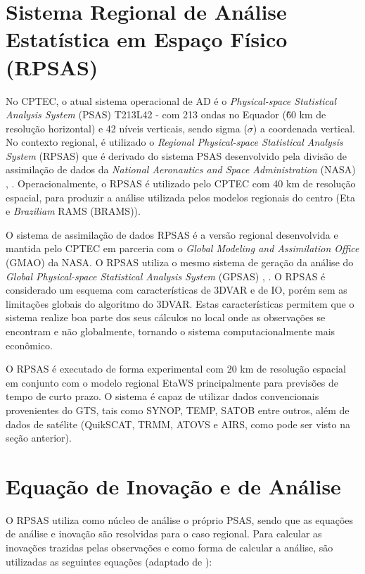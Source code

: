 \section{Sistema Regional de Análise Estatística em Espaço Físico (RPSAS)}
\label{ss:rpsas}

No CPTEC, o atual sistema operacional de AD é o \textit{Physical-space Statistical Analysis System} (PSAS) T213L42 - com 213 ondas no Equador (\~ 60 km de resolução horizontal) e 42 níveis verticais, sendo sigma ($\sigma$) a coordenada vertical. No contexto regional, é utilizado o \textit{Regional Physical-space Statistical Analysis System} (RPSAS) que é derivado do sistema PSAS desenvolvido pela divisão de assimilação de dados da \textit{National Aeronautics and Space Administration} (NASA) \cite{dasilvaetal95}, \cite{courtier97}. Operacionalmente, o RPSAS é utilizado pelo CPTEC com 40 km de resolução espacial, para produzir a análise utilizada pelos modelos regionais do centro (Eta e \textit{Braziliam} RAMS (BRAMS)).

O sistema de assimilação de dados RPSAS é a versão regional desenvolvida e mantida pelo CPTEC em parceria com o \textit{Global Modeling and Assimilation Office} (GMAO) da NASA. O RPSAS utiliza o mesmo sistema de geração da análise do \textit{Global Physical-space Statistical Analysis System} (GPSAS) \cite{dasilvaetal95}, \cite{cohnetal98}. O RPSAS é considerado um esquema com características de 3DVAR e de IO, porém sem as limitações globais do algoritmo do 3DVAR. Estas características permitem que o sistema realize boa parte dos seus cálculos no local onde as observações se encontram e não globalmente, tornando o sistema computacionalmente mais econômico. 

O RPSAS é executado de forma experimental com 20 km de resolução espacial em conjunto com o modelo regional EtaWS principalmente para previsões de tempo de curto prazo. O sistema é capaz de utilizar dados convencionais provenientes do GTS, tais como SYNOP, TEMP, SATOB entre outros, além de dados de satélite (QuikSCAT, TRMM, ATOVS e AIRS, como pode ser visto na seção anterior).

\section{Equação de Inovação e de Análise}
\label{ss:eqinovanl}

O RPSAS utiliza como núcleo de análise o próprio PSAS, sendo que as equações de análise e inovação são resolvidas para o caso regional. Para calcular as inovações trazidas pelas observações e como forma de calcular a análise, são utilizadas as seguintes equações (adaptado de \cite{larsonetal99}):

